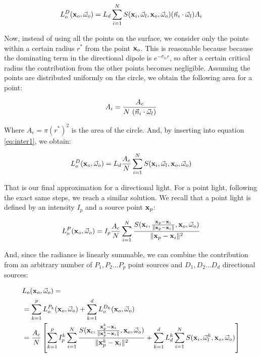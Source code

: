 \begin{equation}
L_o^D(\mathbf{x}_o,\vec{\omega}_o) = L_d \sum_{i = 1}^N S(\mathbf{x}_i, \vec{\omega}_l, \mathbf{x}_o, \vec{\omega}_o) (\vec{n}_i \cdot \vec{\omega}_l) A_i 
\label{eq:inter1}
\end{equation}

Now, instead of using all the points on the surface, we consider only the points within a certain radius $r^*$ from the point $\mathbf{x}_o$. This is reasonable because because the dominating term in the directional dipole is $e^{-\sigma_{tr} r}$, so after a certain critical radius the contribution from the other points becomes negligible. Assuming the points are distributed uniformly on the circle, we obtain the following area for a point:

$$
A_i = \frac{A_c}{N \ (\vec{n}_i \cdot \vec{\omega}_l)}
$$

Where $A_c = \pi (r^*)^2$ is the area of the circle. And, by inserting into equation \ref{eq:inter1}, we obtain:

\begin{equation}
L_o^D(\mathbf{x}_o,\vec{\omega}_o) = L_d \frac{A_c}{N} \sum_{i = 1}^N S(\mathbf{x}_i, \vec{\omega}_l, \mathbf{x}_o, \vec{\omega}_o)
\label{eq:inter2}
\end{equation}

That is our final approximation for a directional light. For a point light, following the exact same steps, we reach a similar solution. We recall that a point light is defined by an intensity $I_p$ and a source point $\mathbf{x}_p$:

\begin{equation}
L_o^P(\mathbf{x}_o,\vec{\omega}_o) = I_p \frac{A_c}{N} \sum_{i = 1}^N \frac{S(\mathbf{x}_i, \frac{\mathbf{x}_p - \mathbf{x}_i}{\|\mathbf{x}_p - \mathbf{x}_i\|}, \mathbf{x}_o, \vec{\omega}_o)}{\|\mathbf{x}_p - \mathbf{x}_i\|^2}
\label{eq:inter3}
\end{equation}

And, since the radiance is linearly summable, we can combine the contribution from an arbitrary number of $P_1, P_2 ... P_p$ point sources and $D_1, D_2 ... D_d$ directional sources:

\begin{equation}
\begin{split}
&L_o(\mathbf{x}_o,\vec{\omega}_o) = \\
&= \sum_{k=1}^{p}L_o^{P_k}(\mathbf{x}_o,\vec{\omega}_o) + \sum_{k=1}^{d}L_o^{D_k}(\mathbf{x}_o,\vec{\omega}_o) \\
&= \frac{A_c}{N} \left[ \sum_{k=1}^{p}I_p^k \sum_{i = 1}^N \frac{S(\mathbf{x}_i, \frac{\mathbf{x}_p^k - \mathbf{x}_i}{\|\mathbf{x}_p^k - \mathbf{x}_i\|}, \mathbf{x}_o, \vec{\omega}_o)}{\|\mathbf{x}_p^k - \mathbf{x}_i\|^2} + \sum_{k=1}^{d} L_d^k \sum_{i = 1}^N S(\mathbf{x}_i, \vec{\omega}^k_l, \mathbf{x}_o, \vec{\omega}_o) \right] 
\end{split}
\end{equation}


